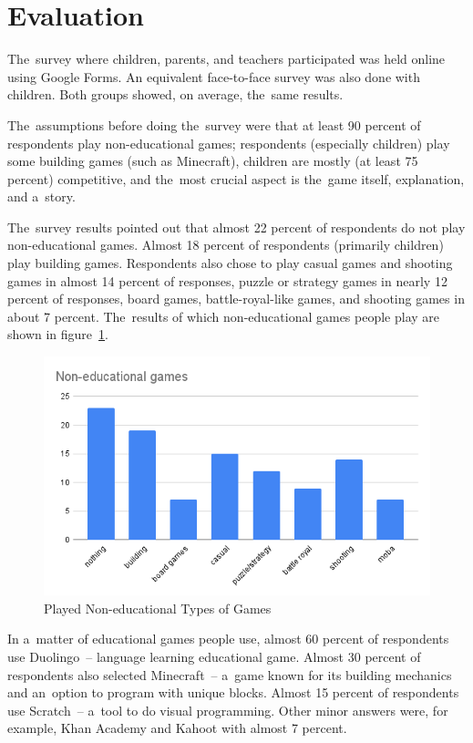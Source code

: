 \section{Evaluation}

The~survey where children, parents, and teachers participated was held online using Google Forms.
An equivalent face-to-face survey was also done with children.
Both groups showed, on average, the~same results.

The~assumptions before doing the~survey were that at least 90 percent of respondents play non-educational games;
respondents (especially children) play some building games (such as Minecraft), children are mostly (at least 75 percent) competitive, and the~most crucial aspect is the~game itself, explanation, and a~story.

The~survey results pointed out that almost 22 percent of respondents do not play non-educational games.
Almost 18 percent of respondents (primarily children) play building games.
Respondents also chose to play casual games and shooting games in almost 14 percent of responses, puzzle or strategy games in nearly 12 percent of responses, board games, battle-royal-like games, and shooting games in about 7 percent.
The~results of which non-educational games people play are shown in figure~\ref{fig:survey:games}.

\begin{figure}
    \centering
    \includegraphics[width=1\linewidth]{assets/survey/non-educational-games.png}
    \caption{Played Non-educational Types of Games}
    \label{fig:survey:games}
\end{figure}

In a~matter of educational games people use, almost 60 percent of respondents use Duolingo~-- language learning educational game.
Almost 30 percent of respondents also selected Minecraft~-- a~game known for its building mechanics and an~option to program with unique blocks.
Almost 15 percent of respondents use Scratch~-- a~tool to do visual programming.
Other minor answers were, for example, Khan Academy and Kahoot with almost 7 percent.  

